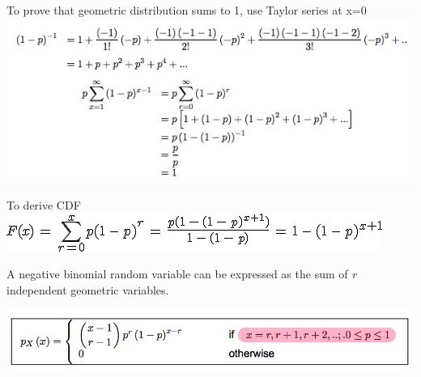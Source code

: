 \documentclass{/out/app/latex/examnotes}
\begin{document}

\ra To prove that geometric distribution sums to 1, use Taylor series at x=0
\includegraphics[scale=0.6]{./img/2geo.jpg}

\ra To derive CDF
\includegraphics[scale=0.5]{./img/2geomcdf.jpg}


A negative binomial random variable can be expressed as the sum of \emph{r} independent geometric variables.

\includegraphics[scale=0.5]{./img/2negbinom.jpg}
\end{document}
